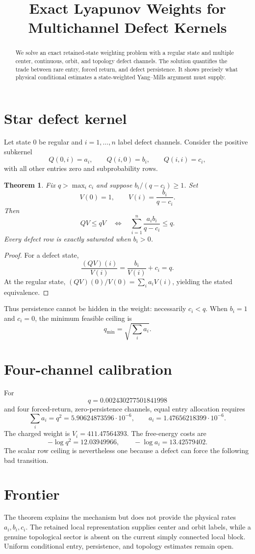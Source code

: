 \documentclass[11pt]{article}
\title{Exact Lyapunov Weights for Multichannel Defect Kernels}
\author{}
\date{}
\newtheorem{theorem}{Theorem}
\begin{document}
\maketitle

\begin{abstract}
We solve an exact retained-state weighting problem with a regular state and
multiple center, continuous, orbit, and topology defect channels.  The
solution quantifies the trade between rare entry, forced return, and defect
persistence.  It shows precisely what physical conditional estimates a
state-weighted Yang--Mills argument must supply.
\end{abstract}

\section{Star defect kernel}
Let state $0$ be regular and $i=1,\dots,n$ label defect channels.  Consider
the positive subkernel
\[
 Q(0,i)=a_i,\qquad Q(i,0)=b_i,\qquad Q(i,i)=c_i,
\]
with all other entries zero and subprobability rows.

\begin{theorem}
Fix $q>\max_i c_i$ and suppose
$b_i/(q-c_i)\ge1$.  Set
\[
 V(0)=1,\qquad V(i)=\frac{b_i}{q-c_i}.
\]
Then
\[
 QV\le qV
 \quad\Longleftrightarrow\quad
 \sum_{i=1}^n\frac{a_i b_i}{q-c_i}\le q.
\]
Every defect row is exactly saturated when $b_i>0$.
\end{theorem}
\begin{proof}
For a defect state,
\[
 \frac{(QV)(i)}{V(i)}=\frac{b_i}{V(i)}+c_i=q.
\]
At the regular state,
$(QV)(0)/V(0)=\sum_i a_iV(i)$, yielding the stated equivalence.
\end{proof}

Thus persistence cannot be hidden in the weight: necessarily $c_i<q$.
When $b_i=1$ and $c_i=0$, the minimum feasible ceiling is
\[
 q_{\min}=\sqrt{\sum_i a_i}.
\]

\section{Four-channel calibration}
For
\[
 q=0.002430277501841998
\]
and four forced-return, zero-persistence channels, equal entry allocation
requires
\[
 \sum_i a_i=q^2=5.90624873596\cdot10^{-6},
 \qquad a_i=1.47656218399\cdot10^{-6}.
\]
The charged weight is $V_i=411.47564393$.  The free-energy costs are
\[
 -\log q^2=12.03949966,
 \qquad -\log a_i=13.42579402.
\]
The scalar row ceiling is nevertheless one because a defect can force the
following bad transition.

\section{Frontier}
The theorem explains the mechanism but does not provide the physical rates
$a_i,b_i,c_i$.  The retained local representation supplies center and orbit
labels, while a genuine topological sector is absent on the current simply
connected local block.  Uniform conditional entry, persistence, and topology
estimates remain open.
\end{document}
